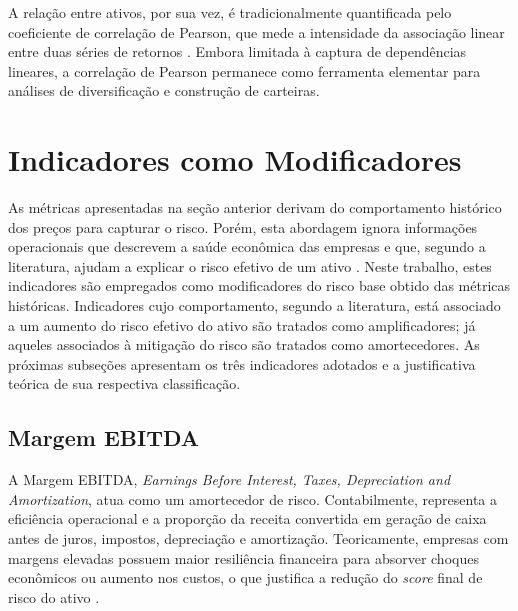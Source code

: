
A relação entre ativos, por sua vez, é tradicionalmente quantificada pelo coeficiente de correlação de Pearson, que mede a intensidade da associação linear entre duas séries de retornos \cite{assaf_neto_mercado_2022}. Embora limitada à captura de dependências lineares, a correlação de Pearson permanece como ferramenta elementar para análises de diversificação e construção de carteiras.

\section{Indicadores como Modificadores}
\label{sec:modificadores}

As métricas apresentadas na seção anterior derivam do comportamento histórico dos preços para capturar o risco. Porém, esta abordagem ignora informações operacionais que descrevem a saúde econômica das empresas e que, segundo a literatura, ajudam a explicar o risco efetivo de um ativo \cite{Intrisano2024Accounting}. Neste trabalho, estes indicadores são empregados como modificadores do risco base obtido das métricas históricas. Indicadores cujo comportamento, segundo a literatura, está associado a um aumento do risco efetivo do ativo são tratados como amplificadores; já aqueles associados à mitigação do risco são tratados como amortecedores. As próximas subseções apresentam os três indicadores adotados e a justificativa teórica de sua respectiva classificação.

\subsection{Margem EBITDA}
A Margem EBITDA, \textit{Earnings Before Interest, Taxes, Depreciation and Amortization}, atua como um amortecedor de risco. Contabilmente, representa a eficiência operacional e a proporção da receita convertida em geração de caixa antes de juros, impostos, depreciação e amortização. Teoricamente, empresas com margens elevadas possuem maior resiliência financeira para absorver choques econômicos ou aumento nos custos, o que justifica a redução do \textit{score} final de risco do ativo \cite{Dirman2020FINANCIALDT}.

